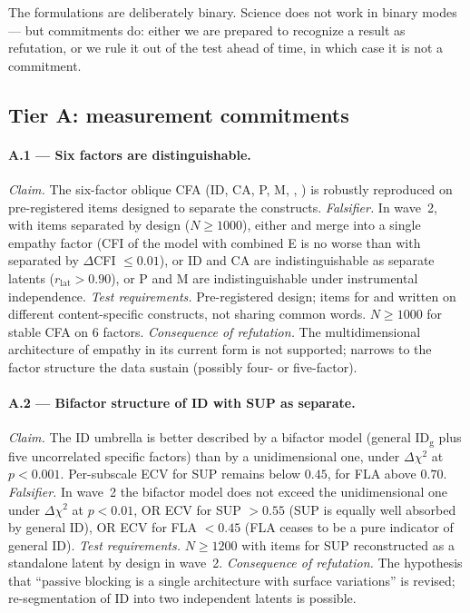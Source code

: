 The formulations are deliberately binary. Science does not work in binary modes --- but commitments do: either we are prepared to recognize a result as refutation, or we rule it out of the test ahead of time, in which case it is not a commitment.

\subsection{Tier A: measurement commitments}
\label{subsec:falsification_tier_a}

\paragraph{A.1 --- Six factors are distinguishable.}
\emph{Claim.} The six-factor oblique CFA (ID, CA, P, M, \EAF{}, \Ecog{}) is robustly reproduced on pre-registered items designed to separate the constructs.
\emph{Falsifier.} In wave~2, with items separated by design ($N \geq 1000$), either \EAF{} and \Ecog{} merge into a single empathy factor (CFI of the model with combined E is no worse than with separated by $\Delta$CFI $\leq 0.01$), or ID and CA are indistinguishable as separate latents ($r_{\mathrm{lat}} > 0.90$), or P and M are indistinguishable under instrumental independence.
\emph{Test requirements.} Pre-registered design; items for \EAF{} and \Ecog{} written on different content-specific constructs, not sharing common words. $N \geq 1000$ for stable CFA on 6 factors.
\emph{Consequence of refutation.} The multidimensional architecture of empathy in its current form is not supported; \DEIC{} narrows to the factor structure the data sustain (possibly four- or five-factor).

\paragraph{A.2 --- Bifactor structure of ID with SUP as separate.}
\emph{Claim.} The ID umbrella is better described by a bifactor model (general ID$_{\mathrm{g}}$ plus five uncorrelated specific factors) than by a unidimensional one, under $\Delta\chi^2$ at $p < 0.001$. Per-subscale ECV for SUP remains below $0.45$, for FLA above $0.70$.
\emph{Falsifier.} In wave~2 the bifactor model does not exceed the unidimensional one under $\Delta\chi^2$ at $p < 0.01$, OR ECV for SUP $> 0.55$ (SUP is equally well absorbed by general ID), OR ECV for FLA $< 0.45$ (FLA ceases to be a pure indicator of general ID).
\emph{Test requirements.} $N \geq 1200$ with items for SUP reconstructed as a standalone latent by design in wave~2.
\emph{Consequence of refutation.} The hypothesis that ``passive blocking is a single architecture with surface variations'' is revised; re-segmentation of ID into two independent latents is possible.

